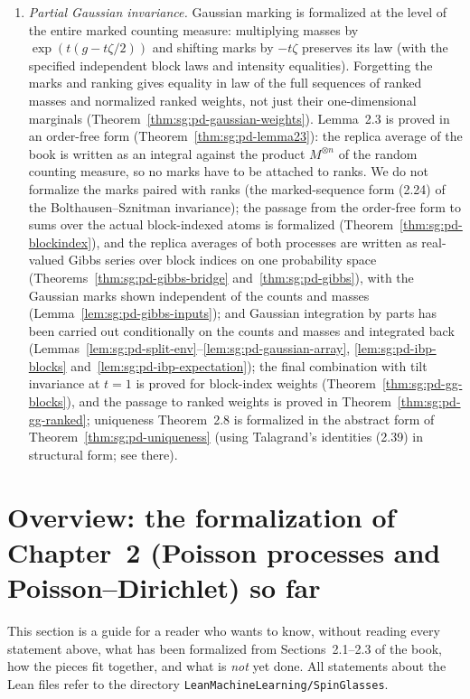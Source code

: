 \begin{remark}
\begin{enumerate}
\item \emph{Partial Gaussian invariance.} Gaussian marking is formalized at the level of the entire marked counting measure: multiplying masses by $\exp(t(g-t\zeta/2))$ and shifting marks by $-t\zeta$ preserves its law (with the specified independent block laws and intensity equalities). Forgetting the marks and ranking gives equality in law of the full sequences of ranked masses and normalized ranked weights, not just their one-dimensional marginals (Theorem~\ref{thm:sg:pd-gaussian-weights}). Lemma~2.3 is proved in an order-free form (Theorem~\ref{thm:sg:pd-lemma23}): the replica average of the book is written as an integral against the product $M^{\otimes n}$ of the random counting measure, so no marks have to be attached to ranks. We do not formalize the marks paired with ranks (the marked-sequence form (2.24) of the Bolthausen--Sznitman invariance); the passage from the order-free form to sums over the actual block-indexed atoms is formalized (Theorem~\ref{thm:sg:pd-blockindex}), and the replica averages of both processes are written as real-valued Gibbs series over block indices on one probability space (Theorems~\ref{thm:sg:pd-gibbs-bridge} and~\ref{thm:sg:pd-gibbs}), with the Gaussian marks shown independent of the counts and masses (Lemma~\ref{lem:sg:pd-gibbs-inputs}); and Gaussian integration by parts has been carried out conditionally on the counts and masses and integrated back (Lemmas~\ref{lem:sg:pd-split-env}--\ref{lem:sg:pd-gaussian-array}, \ref{lem:sg:pd-ibp-blocks} and~\ref{lem:sg:pd-ibp-expectation}); the final combination with tilt invariance at $t=1$ is proved for block-index weights (Theorem~\ref{thm:sg:pd-gg-blocks}), and the passage to ranked weights is proved in Theorem~\ref{thm:sg:pd-gg-ranked}; uniqueness Theorem~2.8 is formalized in the abstract form of Theorem~\ref{thm:sg:pd-uniqueness} (using Talagrand's identities (2.39) in structural form; see there).
\end{enumerate}
\end{remark}

\section{Overview: the formalization of Chapter~2 (Poisson processes and Poisson--Dirichlet) so far}\label{sec:sg:pd-overview}

This section is a guide for a reader who wants to know, without reading every statement above, what has been formalized from Sections~2.1--2.3 of the book, how the pieces fit together, and what is \emph{not} yet done. All statements about the Lean files refer to the directory \texttt{LeanMachineLearning/SpinGlasses}.

